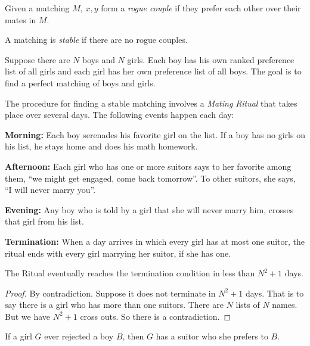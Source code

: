\documentclass[11pt]{article}
\begin{document}
\begin{definition}
Given a matching $M$, $x,y$ form a \emph{rogue couple} if they prefer each other over their mates in
$M$.
\end{definition}

\begin{definition}
A matching is \emph{stable} if there are no rogue couples.
\end{definition}

\begin{definition}
Suppose there are $N$ boys and $N$ girls. Each boy has his own ranked preference list of all girls
and each girl has her own preference list of all boys. The goal is to find a perfect matching of
boys and girls.
\end{definition}

\begin{definition}
The procedure for finding a stable matching involves a \emph{Mating Ritual} that takes place over
several days. The following events happen each day:

\textbf{Morning:} Each boy serenades his favorite girl on the list. If a boy has no girls on his
list, he stays home and does his math homework.

\textbf{Afternoon:} Each girl who has one or more suitors says to her favorite among them, ``we might
get engaged, come back tomorrow''. To other suitors, she says, ``I will never marry you''.

\textbf{Evening:} Any boy who is told by a girl that she will never marry him, crosses that girl from
his list.

\textbf{Termination:} When a day arrives in which every girl has at most one suitor, the ritual ends
with every girl marrying her suitor, if she has one.
\end{definition}

\begin{theorem}
The Ritual eventually reaches the termination condition in less than $N^2+1$ days.
\end{theorem}

\begin{proof}
By contradiction. Suppose it does not terminate in $N^2+1$ days. That is to say there is a girl who
has more than one suitors. There are $N$ lists of $N$ names. But we have $N^2+1$ cross outs. So there
is a contradiction.
\end{proof}

\begin{lemma}
If a girl $G$ ever rejected a boy $B$, then $G$ has a suitor who she prefers to $B$.
\end{lemma}
\end{document}
